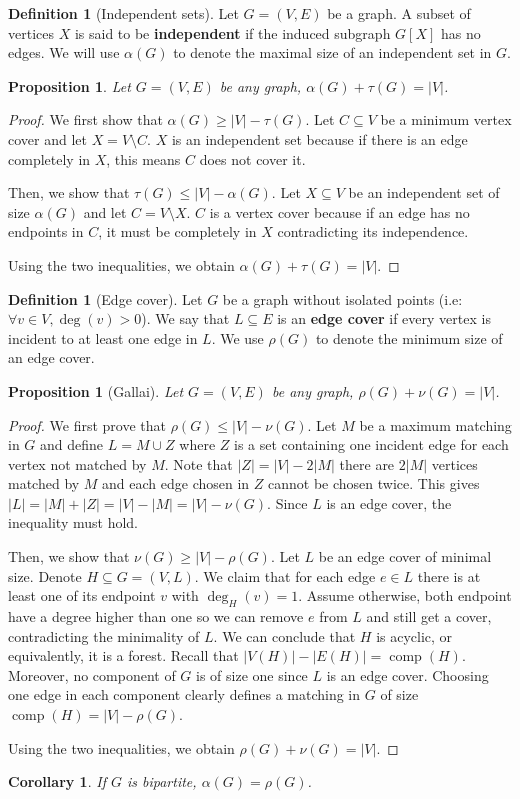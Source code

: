 \documentclass{tufte-handout}
\newtheorem{cor}[thm]{Corollary}
\newtheorem{prop}[thm]{Proposition}
\theoremstyle{definition}
\newtheorem{defn}[thm]{Definition}
\theoremstyle{remark}
\DeclareMathOperator{\comp}{comp}
\begin{document}
\begin{defn}[Independent sets]
	Let $G = (V,E)$ be a graph. A subset of vertices $X$ is said to be \textbf{independent} if the induced subgraph $G[X]$ has no edges. We will use $\alpha(G)$ to denote the maximal size of an independent set in $G$.
\end{defn}
\begin{prop}
	Let $G=(V,E)$ be any graph, $\alpha(G) + \tau(G) = |V|$.
\end{prop}
\begin{proof}
	We first show that $\alpha(G) \geq |V| - \tau(G)$. Let $C \subseteq V$ be a minimum vertex cover and let $X = V \setminus C$. $X$ is an independent set because if there is an edge completely in $X$, this means $C$ does not cover it.
	
	Then, we show that $\tau(G) \leq |V| - \alpha(G)$. Let $X \subseteq V$ be an independent set of size $\alpha(G)$ and let $C = V \setminus X$. $C$ is a vertex cover because if an edge has no endpoints in $C$, it must be completely in $X$ contradicting its independence.
	
	Using the two inequalities, we obtain $\alpha(G) + \tau(G) = |V|$.
\end{proof}
\begin{defn}[Edge cover]
	Let $G$ be a graph without isolated points (i.e: $\forall v \in V, \deg(v) > 0$). We say that $L \subseteq E$ is an \textbf{edge cover} if every vertex is incident to at least one edge in $L$. We use $\rho(G)$ to denote the minimum size of an edge cover.
\end{defn}
\begin{prop}[Gallai]
	Let $G=(V,E)$ be any graph, $\rho(G) + \nu(G) = |V|$.
\end{prop}
\begin{proof}
	We first prove that $\rho(G) \leq |V| - \nu(G)$. Let $M$ be a maximum matching in $G$ and define $L = M \cup Z$ where $Z$ is a set containing one incident edge for each vertex not matched by $M$. Note that $|Z| = |V| - 2|M|$ there are $2|M|$ vertices matched by $M$ and each edge chosen in $Z$ cannot be chosen twice. This gives $|L| = |M| + |Z| = |V| -|M| = |V| - \nu(G)$. Since $L$ is an edge cover, the inequality must hold.
	
	Then, we show that $\nu(G) \geq |V| - \rho(G)$. Let $L$ be an edge cover of minimal size. Denote $H \subseteq G = (V,L)$. We claim that for each edge $e \in L$ there is at least one of its endpoint $v$ with $\deg_H(v) = 1$. Assume otherwise, both endpoint have a degree higher than one so we can remove $e$ from $L$ and still get a cover, contradicting the minimality of $L$. We can conclude that $H$ is acyclic, or equivalently, it is a forest. Recall that $|V(H)| - |E(H)| = \comp(H)$. Moreover, no component of $G$ is of size one since $L$ is an edge cover. Choosing one edge in each component clearly defines a matching in $G$ of size $\comp(H) = |V| - \rho(G)$.
	
	Using the two inequalities, we obtain $\rho(G) + \nu(G) = |V|$.
\end{proof}
\begin{cor}
If $G$ is bipartite, $\alpha(G) = \rho(G)$.
\end{cor}
\end{document}

